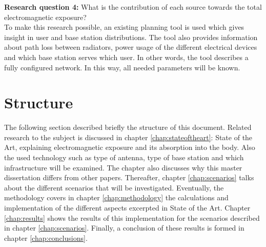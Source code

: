 \textbf{Research question 4:} What is the contribution of each source towards the total electromagnetic exposure?\\

To make this research possible, an existing planning tool is used which gives insight in user and base station distributions.
The tool also provides information about path loss between radiators, power usage of the different electrical devices and which base station serves which user. In other words, the tool describes 
a fully configured network.
In this way, all needed parameters will be known.



\section{Structure}
\label{sec:structure}
The following section described briefly the structure of this document. Related research to the subject is discussed in chapter \ref{chap:stateoftheart}: State of the Art, explaining
electromagnetic exposure and its absorption into the body. Also the used technology such as type of antenna, type of base station and 
which infrastructure will be examined. The chapter also discusses why this master dissertation differs from other papers.
Thereafter, chapter \ref{chap:scenarios} talks about the different scenarios that will be investigated. 
Eventually, the methodology covers in chapter \ref{chap:methodology} the calculations and implementation of the different aspects excerpted in State of the Art.
Chapter \ref{chap:results} shows the results of this 
implementation for the scenarios described in chapter \ref{chap:scenarios}. 
Finally, a conclusion of these results is formed in chapter \ref{chap:conclusions}.

